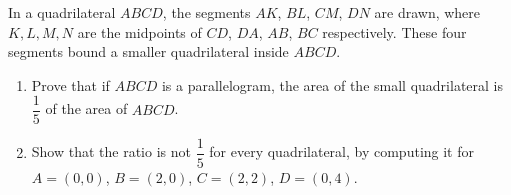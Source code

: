 In a quadrilateral $ABCD$, the segments $AK$, $BL$, $CM$, $DN$ are drawn, where $K,L,M,N$ are the midpoints of $CD$, $DA$, $AB$, $BC$ respectively. These four segments bound a smaller quadrilateral inside $ABCD$.
\begin{enumerate}
\item[(a)] Prove that if $ABCD$ is a parallelogram, the area of the small quadrilateral is $\dfrac{1}{5}$ of the area of $ABCD$.
\item[(b)] Show that the ratio is not $\dfrac{1}{5}$ for every quadrilateral, by computing it for $A=(0,0)$, $B=(2,0)$, $C=(2,2)$, $D=(0,4)$.
\end{enumerate}
